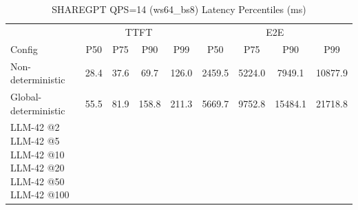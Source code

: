\begin{table}[htbp]
\centering
\caption{SHAREGPT QPS=14 (ws64_bs8) Latency Percentiles (ms)}
\label{tab:sharegpt_qps14_ws64_bs8}
\begin{tabular}{l|cccc|cccc}
\toprule
& \multicolumn{4}{c|}{TTFT} & \multicolumn{4}{c}{E2E} \\
Config & P50 & P75 & P90 & P99 & P50 & P75 & P90 & P99 \\
\midrule
Non-deterministic & 28.4 & 37.6 & 69.7 & 126.0 & 2459.5 & 5224.0 & 7949.1 & 10877.9 \\
Global-deterministic & 55.5 & 81.9 & 158.8 & 211.3 & 5669.7 & 9752.8 & 15484.1 & 21718.8 \\
LLM-42 @2%
LLM-42 @5%
LLM-42 @10%
LLM-42 @20%
LLM-42 @50%
LLM-42 @100%
\bottomrule
\end{tabular}
\end{table}
